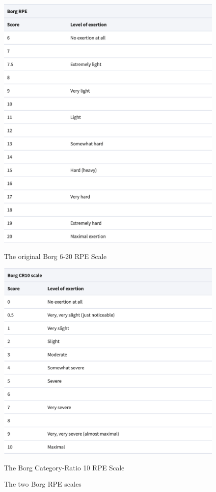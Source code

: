 \begin{figure}[!ht]
  \begin{minipage}[c]{0.4\linewidth}
      \centering
      \includegraphics[width=\linewidth]{figures/borg20.png}
      \captionsetup{justification=centering}
      \caption[Borg 20]{The original Borg 6-20 RPE Scale \cite{Williams2017}} \label{fig:borg20}
  \end{minipage}\hfill
  \begin{minipage}[c]{0.4\linewidth}
      \centering
      \includegraphics[width=\linewidth]{figures/borgc10.png}
      \captionsetup{justification=centering}
      \caption[Borg CR10]{The Borg Category-Ratio 10 RPE Scale \cite{Williams2017}}\label{fig:borgcr10}
  \end{minipage}
  \caption*{The two Borg RPE scales}
\end{figure}


